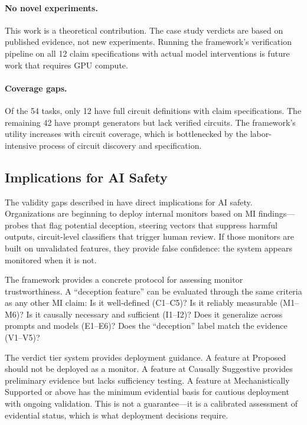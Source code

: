 \documentclass[10pt]{article}
\begin{document}
\paragraph{No novel experiments.} This work is a theoretical contribution. The case study verdicts are based on published evidence, not new experiments. Running the framework's verification pipeline on all 12 claim specifications with actual model interventions is future work that requires GPU compute.

\paragraph{Coverage gaps.} Of the 54 tasks, only 12 have full circuit definitions with claim specifications. The remaining 42 have prompt generators but lack verified circuits. The framework's utility increases with circuit coverage, which is bottlenecked by the labor-intensive process of circuit discovery and specification.

\subsection{Implications for AI Safety}

The validity gaps described in  have direct implications for AI safety. Organizations are beginning to deploy internal monitors based on MI findings---probes that flag potential deception, steering vectors that suppress harmful outputs, circuit-level classifiers that trigger human review. If those monitors are built on unvalidated features, they provide false confidence: the system appears monitored when it is not.

The framework provides a concrete protocol for assessing monitor trustworthiness. A ``deception feature'' can be evaluated through the same criteria as any other MI claim: Is it well-defined (C1--C5)? Is it reliably measurable (M1--M6)? Is it causally necessary and sufficient (I1--I2)? Does it generalize across prompts and models (E1--E6)? Does the ``deception'' label match the evidence (V1--V5)?

The verdict tier system provides deployment guidance. A feature at Proposed should not be deployed as a monitor. A feature at Causally Suggestive provides preliminary evidence but lacks sufficiency testing. A feature at Mechanistically Supported or above has the minimum evidential basis for cautious deployment with ongoing validation. This is not a guarantee---it is a calibrated assessment of evidential status, which is what deployment decisions require.
\end{document}
